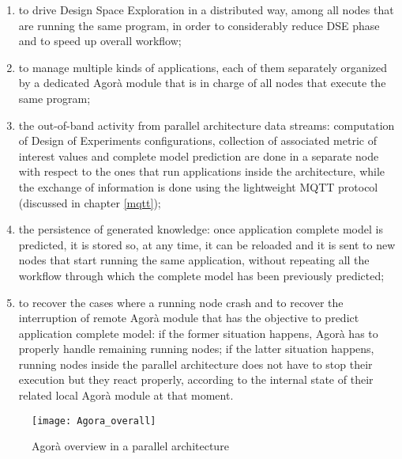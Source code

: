 \begin{enumerate}
    
    \item to drive Design Space Exploration in a distributed way, among all nodes that are running the same program, in order to considerably reduce DSE phase and to speed up overall workflow;
    
    \item to manage multiple kinds of applications, each of them separately organized by a dedicated Agorà module that is in charge of all nodes that execute the same program;
    
    \item the out-of-band activity from parallel architecture data streams: computation of Design of Experiments configurations, collection of associated metric of interest values and complete model prediction are done in a separate node with respect to the ones that run applications inside the architecture, while the exchange of information is done using the lightweight MQTT protocol (discussed in chapter \ref{mqtt});
    
    \item the persistence of generated knowledge: once application complete model is predicted, it is stored so, at any time, it can be reloaded and it is sent to new nodes that start running the same application, without repeating all the workflow through which the complete model has been previously predicted;
    
    \item to recover the cases where a running node crash and to recover the interruption of remote Agorà module that has the objective to predict application complete model: if the former situation happens, Agorà has to properly handle remaining running nodes; if the latter situation happens, running nodes inside the parallel architecture does not have to stop their execution but they react properly, according to the internal state of their related local Agorà module at that moment.

\end{enumerate}

\begin{figure}[H]

    \centering
    \texttt{[image: Agora\_overall]}
    \caption{Agorà overview in a parallel architecture}
    \label{fig::tesiCris_overview}
    
\end{figure}

